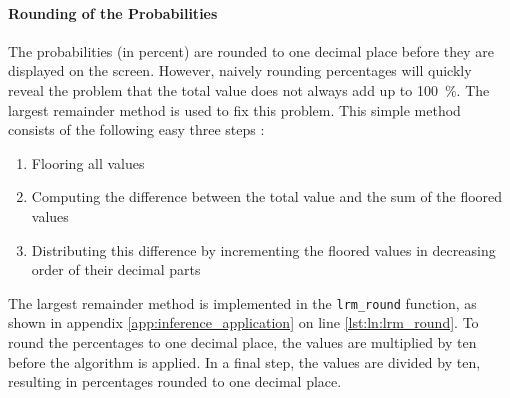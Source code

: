 \paragraph{Rounding of the Probabilities}
The probabilities (in percent) are rounded to one decimal place before they are displayed on the screen.
However, naively rounding percentages will quickly reveal the problem that the total value does not always add up to \SI{100}{\percent}.
The largest remainder method is used to fix this problem.
This simple method consists of the following easy three steps \cite{}: %
\begin{enumerate}
  \item Flooring all values
  \item Computing the difference between the total value and the sum of the floored values
  \item Distributing this difference by incrementing the floored values in decreasing order of their decimal parts
\end{enumerate}

The largest remainder method is implemented in the \texttt{lrm\_round} function, as shown in appendix \ref{app:inference_application} on line \ref{lst:ln:lrm_round}. %
To round the percentages to one decimal place, the values are multiplied by ten before the algorithm is applied.
In a final step, the values are divided by ten, resulting in percentages rounded to one decimal place.

